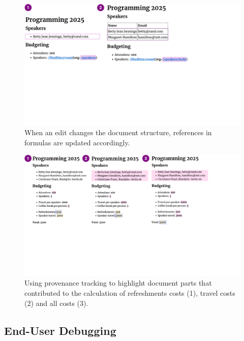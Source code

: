 \documentclass[sigconf,anonymous,screen]{acmart}
\begin{document}
\begin{figure}[t]
\includegraphics[width=0.9\columnwidth,clip,trim=0cm 9.5cm 8cm 0cm]{fig/coevolution.pdf}
\caption{When an edit changes the document structure, references in formulas are updated accordingly.}
\label{fig:coevolution}
\end{figure}


\begin{figure}[t]
\includegraphics[width=1\columnwidth,clip,trim=0cm 8cm 5cm 0cm]{fig/provenance.pdf}
\vspace{-1em}
\caption{Using provenance tracking to highlight document parts that contributed to the
calculation of refreshments costs (1), travel costs (2) and all costs (3).}
\label{fig:provenance}
\vspace{-0.5em}
\end{figure}


\subsection{End-User Debugging}
\label{sec:impl-provenance}
\end{document}
